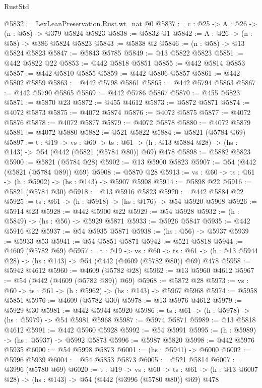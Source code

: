 \begin{lexlean}{RustStd}
\begin{coremodule}
@5832 := LexLeanPreservation.Rust.wt_nat @0
@5837 := {c : @25} -> {A : @26} -> (n : @58) -> @379 @5824 @5823
@5838 := @5832 @1
@5842 := {A : @26} -> (n : @58) -> @386 @5824 @5823
@5843 := @5838 @2
@5846 := (n : @58) -> @13 @5824 @5823
@5847 := @5843 @5785
@5849 := @13 @5822 @5823
@5851 := @442 @5822 @22
@5853 := @442 @5818 @5851
@5855 := @442 @5814 @5853
@5857 := @442 @5810 @5855
@5859 := @442 @5806 @5857
@5861 := @442 @5802 @5859
@5863 := @442 @5798 @5861
@5865 := @442 @5794 @5863
@5867 := @442 @5790 @5865
@5869 := @442 @5786 @5867
@5870 := @455 @5823
@5871 := @5870 @23
@5872 := @455 @4612
@5873 := @5872 @5871
@5874 := @4072 @5873
@5875 := @4072 @5874
@5876 := @4072 @5875
@5877 := @4072 @5876
@5878 := @4072 @5877
@5879 := @4072 @5878
@5880 := @4072 @5879
@5881 := @4072 @5880
@5882 := @521 @5822
@5884 := @5821 (@5784 @69)
@5897 := {t : @19} ->
  {vs : @60} ->
  {ts : @61} -> (h : @13 @5884 @28) -> (hs : @143) -> @54 (@442 (@5821 (@5784 @80)) @69) @478
@5898 := @5882 @5823
@5900 := @5821 (@5784 @28)
@5902 := @13 @5900 @5823
@5907 := @54 (@442 (@5821 (@5784 @89)) @69)
@5908 := @5870 @28
@5913 := {vs : @60} -> {ts : @61} -> (h : @5902) -> (hs : @143) -> @5907 @5908
@5914 := @5898 @22
@5916 := @5821 (@5784 @30)
@5918 := @13 @5916 @5823
@5920 := @442 @5884 @22
@5925 := {ts : @61} -> (h : @5918) -> (hs : @176) -> @54 @5920 @5908
@5926 := @5914 @23
@5928 := @442 @5900 @22
@5929 := @54 @5928
@5932 := (h : @5849) -> (hs : @56) -> @5929 @5871
@5933 := @5926 @5847
@5935 := @442 @5916 @22
@5937 := @54 @5935 @5871
@5938 := (hs : @56) -> @5937
@5939 := @5933 @53
@5941 := @54 @5851 @5871
@5942 := @521 @5818
@5944 := @4609 (@5782 @69)
@5957 := {t : @19} ->
  {vs : @60} ->
  {ts : @61} -> (h : @13 @5944 @28) -> (hs : @143) -> @54 (@442 (@4609 (@5782 @80)) @69) @478
@5958 := @5942 @4612
@5960 := @4609 (@5782 @28)
@5962 := @13 @5960 @4612
@5967 := @54 (@442 (@4609 (@5782 @89)) @69)
@5968 := @5872 @28
@5973 := {vs : @60} -> {ts : @61} -> (h : @5962) -> (hs : @143) -> @5967 @5968
@5974 := @5958 @5851
@5976 := @4609 (@5782 @30)
@5978 := @13 @5976 @4612
@5979 := @5929 @30
@5981 := @442 @5944 @5920
@5986 := {ts : @61} -> (h : @5978) -> (hs : @5979) -> @54 @5981 @5968
@5987 := @5974 @5871
@5989 := @13 @5818 @4612
@5991 := @442 @5960 @5928
@5992 := @54 @5991
@5995 := (h : @5989) -> (hs : @5937) -> @5992 @5873
@5996 := @5987 @5820
@5998 := @442 @5976 @5935
@6000 := @54 @5998 @5873
@6001 := (hs : @5941) -> @6000
@6002 := @5996 @5939
@6004 := @54 @5853 @5873
@6005 := @521 @5814
@6007 := @3996 (@5780 @69)
@6020 := {t : @19} ->
  {vs : @60} ->
  {ts : @61} -> (h : @13 @6007 @28) -> (hs : @143) -> @54 (@442 (@3996 (@5780 @80)) @69) @478

\end{coremodule}
\end{lexlean}
